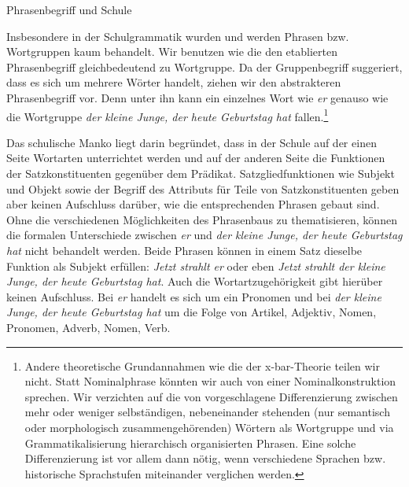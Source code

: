 \begin{Exkurs}{Phrasenbegriff und Schule}
\label{ExkursPhrase_Schule}
 
Insbesondere in der Schulgrammatik wurden und werden Phrasen bzw. Wortgruppen kaum behandelt. Wir benutzen wie die \citet[36, §11]{Duden2022} den etablierten Phrasenbegriff gleichbedeutend zu Wortgruppe. Da der Gruppenbegriff suggeriert, dass es sich um mehrere Wörter handelt, ziehen wir den abstrakteren Phrasenbegriff vor. Denn unter ihn kann ein einzelnes Wort wie \textit{er} genauso wie die Wortgruppe \textit{der kleine Junge, der heute Geburtstag hat} fallen.\footnote{Andere theoretische Grundannahmen wie die der x-bar-Theorie teilen wir nicht. Statt Nominalphrase könnten wir auch von einer Nominalkonstruktion sprechen. Wir verzichten auf die von \citet[136--137]{Himmelmann1997} vorgeschlagene Differenzierung zwischen mehr oder weniger selbständigen, nebeneinander stehenden (nur semantisch oder morphologisch zusammengehörenden) Wörtern als Wortgruppe und via Grammatikalisierung hierarchisch organisierten Phrasen. Eine solche Differenzierung ist vor allem dann nötig, wenn verschiedene Sprachen bzw. historische Sprachstufen miteinander verglichen werden.} 

Das schulische Manko liegt darin begründet, dass in der Schule auf der einen Seite Wortarten unterrichtet werden und auf der anderen Seite die Funktionen der Satzkonstituenten gegenüber dem Prädikat. Satzgliedfunktionen wie Subjekt und Objekt sowie der Begriff des Attributs für Teile von Satzkonstituenten geben aber keinen Aufschluss darüber, wie die entsprechenden Phrasen gebaut sind. Ohne die verschiedenen Möglichkeiten des Phrasenbaus zu thematisieren, können die formalen Unterschiede zwischen \textit{er} und \textit{der kleine Junge, der heute Geburtstag hat} nicht behandelt werden. Beide Phrasen können in einem Satz dieselbe Funktion als Subjekt erfüllen: \textit{Jetzt strahlt er} oder eben \textit{Jetzt strahlt der kleine Junge, der heute Geburtstag hat}. Auch die Wortartzugehörigkeit gibt hierüber keinen Aufschluss. Bei \textit{er} handelt es sich um ein Pronomen und bei \textit{der kleine Junge, der heute Geburtstag hat} um die Folge von Artikel, Adjektiv, Nomen, Pronomen, Adverb, Nomen, Verb.


\end{Exkurs}
